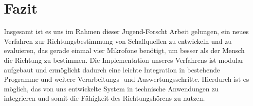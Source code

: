 
\section{Fazit}
Insgesamt ist es uns im Rahmen dieser Jugend-Forscht Arbeit gelungen, ein neues Verfahren zur Richtungsbestimmung von Schallquellen zu entwickeln und zu evaluieren, das gerade einmal vier Mikrofone benötigt, um besser als der Mensch die Richtung zu bestimmen. Die Implementation unseres Verfahrens ist modular aufgebaut und ermöglicht dadurch eine leichte Integration in bestehende Programme und weitere Verarbeitungs- und Auswertungsschritte. Hierdurch ist es möglich, das von uns entwickelte System in technische Anwendungen zu integrieren und somit die Fähigkeit des Richtungshörens zu nutzen.
